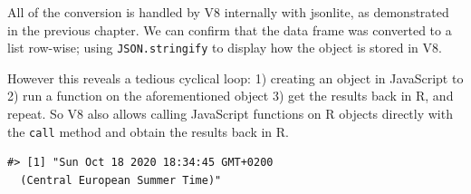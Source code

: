\documentclass[10pt,]{krantz}
\makeatletter
\newenvironment{Shaded}{\begin{snugshade}}{\end{snugshade}}
\newcommand{\CommentTok}[1]{\textcolor[rgb]{0.37,0.37,0.37}{\textit{#1}}}
\newcommand{\DecValTok}[1]{\textcolor[rgb]{0.06,0.06,0.06}{#1}}
\newcommand{\KeywordTok}[1]{\textcolor[rgb]{0.27,0.27,0.27}{\textbf{#1}}}
\newcommand{\NormalTok}[1]{#1}
\newcommand{\OperatorTok}[1]{\textcolor[rgb]{0.43,0.43,0.43}{\textbf{#1}}}
\newcommand{\StringTok}[1]{\textcolor[rgb]{0.5,0.5,0.5}{#1}}
\newenvironment{kframe}{%
\medskip{}
\setlength{\fboxsep}{.8em}
 \def\at@end@of@kframe{}%
 \ifinner\ifhmode%
  \def\at@end@of@kframe{\end{minipage}}%
  \begin{minipage}{\columnwidth}%
 \fi\fi%
 \def\FrameCommand##1{\hskip\@totalleftmargin \hskip-\fboxsep
 \colorbox{shadecolor}{##1}\hskip-\fboxsep
     \hskip-\linewidth \hskip-\@totalleftmargin \hskip\columnwidth}%
 \MakeFramed {\advance\hsize-\width
   \@totalleftmargin\z@ \linewidth\hsize
   \@setminipage}}%
 {\par\unskip\endMakeFramed%
 \at@end@of@kframe}
\renewenvironment{Shaded}{\begin{kframe}}{\end{kframe}}
\makeatother
\begin{document}
\begin{Shaded}
\end{Shaded}

All of the conversion is handled by V8 internally with jsonlite, as demonstrated in the previous chapter. We can confirm that the data frame was converted to a list row-wise; using \texttt{JSON.stringify} to display how the object is stored in V8.

\begin{Shaded}
\end{Shaded}

However this reveals a tedious cyclical loop: 1) creating an object in JavaScript to 2) run a function on the aforementioned object 3) get the results back in R, and repeat. So V8 also allows calling JavaScript functions on R objects directly with the \texttt{call} method and obtain the results back in R.

\begin{Shaded}
\end{Shaded}

\begin{verbatim}
#> [1] "Sun Oct 18 2020 18:34:45 GMT+0200 
  (Central European Summer Time)"
\end{verbatim}
\end{document}
